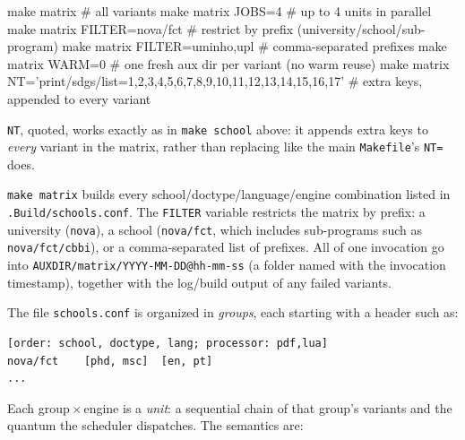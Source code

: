 \begin{bashcode}
make matrix                  # all variants
make matrix JOBS=4           # up to 4 units in parallel
make matrix FILTER=nova/fct  # restrict by prefix (university/school/sub-program)
make matrix FILTER=uminho,upl  # comma-separated prefixes
make matrix WARM=0           # one fresh aux dir per variant (no warm reuse)
make matrix NT='print/sdgs/list={1,2,3,4,5,6,7,8,9,10,11,12,13,14,15,16,17}'
                              # extra \ntsetup keys, appended to every variant
\end{bashcode}
\verb!NT!, quoted, works exactly as in \verb!make school! above: it appends
extra \latexinline{\ntsetup} keys to \emph{every} variant in the matrix,
rather than replacing \latexinline{\ntoverride} like the main
\verb!Makefile!'s \verb!NT=! does.

\verb!make matrix! builds every school/doctype/language/engine combination
listed in \verb!.Build/schools.conf!.  The \verb!FILTER! variable restricts
the matrix by prefix: a university (\texttt{nova}), a school
(\texttt{nova/fct}, which includes sub-programs such as
\texttt{nova/fct/cbbi}), or a comma-separated list of prefixes.  All
 of one invocation go into
\verb!AUXDIR/matrix/YYYY-MM-DD@hh-mm-ss! (a folder named with the invocation
timestamp), together with the log/build output of any failed variants.

The file \verb!schools.conf! is organized in \emph{groups}, each starting
with a header such as:

\begin{verbatim}
[order: school, doctype, lang; processor: pdf,lua]
nova/fct    [phd, msc]  [en, pt]
...
\end{verbatim}

Each group\,$\times$\,engine is a \emph{unit}: a sequential chain of that
group's variants and the quantum the scheduler dispatches.  The semantics are:

